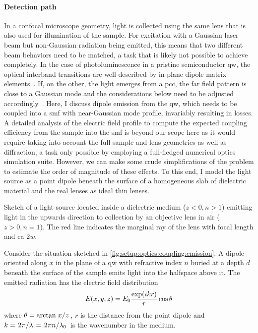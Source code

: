 \paragraph{Detection path}\label{par:setup:optics:coupling:detection}
In a confocal microscope geometry, light is collected using the same lens that is also used for illumination of the sample.
For excitation with a Gaussian laser beam but non-Gaussian radiation being emitted, this means that two different beam behaviors need to be matched, a task that is likely not possible to achieve completely.
In the case of photoluminescence in a pristine semiconductor \gls{qw}, the optical interband transitions are well described by in-plane dipole matrix elements~\cite{Gu2013}.
If, on the other, the light emerges from a \gls{pcc}, the far field pattern is close to a Gaussian mode and the considerations below need to be adjusted accordingly~\cite{Wu2024}.
Here, I discuss dipole emission from the \gls{qw}, which needs to be coupled into a \gls{smf} with near-Gaussian mode profile, invariably resulting in losses.
A detailed analysis of the electric field profile to compute the expected coupling efficiency from the sample into the \gls{smf} is beyond our scope here as it would require taking into account the full sample and lens geometries as well as diffraction, a task only possible by employing a full-fledged numerical optics simulation suite.
However, we can make some crude simplifications of the problem to estimate the order of magnitude of these effects.
To this end, I model the light source as a point dipole beneath the surface of a homogeneous slab of dielectric material and the real lenses as ideal thin lenses.

\begin{marginfigure}
    
    \caption[]{
        Sketch of a light source located inside a dielectric medium ($z < 0, n > 1$) emitting light in the upwards direction to collection by an objective lens in air ($z > 0, n = 1$).
        The red line indicates the marginal ray of the lens with focal length \fob and \gls{ca} $2w$.
    }
    \label{fig:setup:optics:coupling:emission}
\end{marginfigure}

Consider the situation sketched in \cref{fig:setup:optics:coupling:emission}.
A dipole oriented along $x$ in the plane of a  \gls{qw} with refractive index $n$ buried at a depth $d$ beneath the surface of the sample emits light into the halfspace above it.
The emitted radiation has the electric field distribution~\cite{Griffiths2017}
\begin{equation}\label{eq:setup:optics:coupling:efield}
    E(x,y,z) = E_{0}\frac{\exp(i k r)}{r}\cos\theta
\end{equation}
where $\theta=\arctan{\flatfrac{x}{z}}$, $r$ is the distance from the point dipole and $k=\flatfrac{2\pi}{\lambda}=\flatfrac{2\pi n}{\lambda_0}$ is the wavenumber in the medium.

